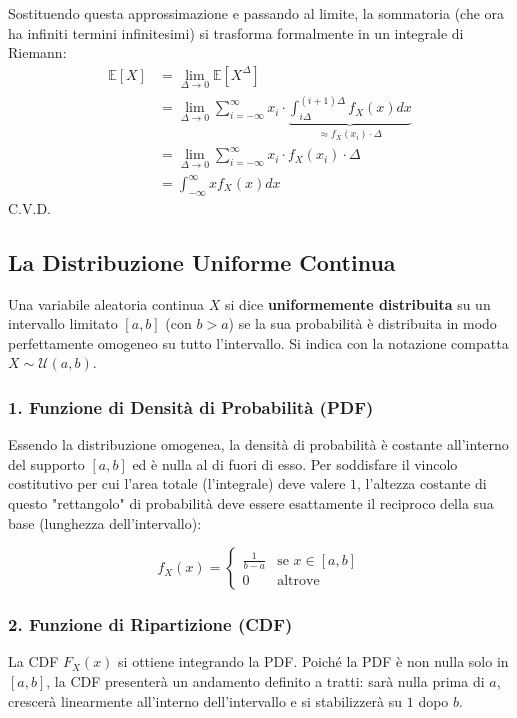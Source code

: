 Sostituendo questa approssimazione e passando al limite, la sommatoria (che ora ha infiniti termini infinitesimi) si trasforma formalmente in un integrale di Riemann:
\begin{align*}
\mathbb{E}[X] &= \lim_{\Delta \to 0} \mathbb{E}[X^\Delta] \\
&= \lim_{\Delta \to 0} \sum_{i=-\infty}^{\infty} x_i \cdot \underbrace{\int_{i\Delta}^{(i+1)\Delta} f_X(x) dx}_{\approx f_X(x_i) \cdot \Delta} \\
&= \lim_{\Delta \to 0} \sum_{i=-\infty}^{\infty} x_i \cdot f_X(x_i) \cdot \Delta \\
&= \int_{-\infty}^{\infty} x f_X(x) dx
\end{align*}
C.V.D.
\subsection{La Distribuzione Uniforme Continua}

Una variabile aleatoria continua $X$ si dice \textbf{uniformemente distribuita} su un intervallo limitato $[a, b]$ (con $b > a$) se la sua probabilità è distribuita in modo perfettamente omogeneo su tutto l'intervallo. 
Si indica con la notazione compatta $X \sim \mathcal{U}(a, b)$.

\subsubsection{1. Funzione di Densità di Probabilità (PDF)}
Essendo la distribuzione omogenea, la densità di probabilità è costante all'interno del supporto $[a, b]$ ed è nulla al di fuori di esso. 
Per soddisfare il vincolo costitutivo per cui l'area totale (l'integrale) deve valere $1$, l'altezza costante di questo "rettangolo" di probabilità deve essere esattamente il reciproco della sua base (lunghezza dell'intervallo):

\begin{equation}
f_X(x) = 
\begin{cases} 
\frac{1}{b-a} & \text{se } x \in [a, b] \\ 
0 & \text{altrove} 
\end{cases}
\end{equation}

\subsubsection{2. Funzione di Ripartizione (CDF)}
La CDF $F_X(x)$ si ottiene integrando la PDF. Poiché la PDF è non nulla solo in $[a, b]$, la CDF presenterà un andamento definito a tratti: sarà nulla prima di $a$, crescerà linearmente all'interno dell'intervallo e si stabilizzerà su $1$ dopo $b$.

